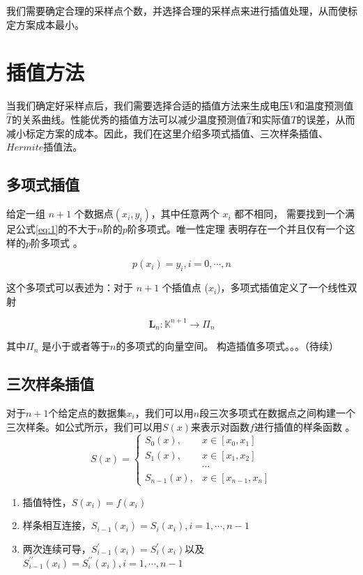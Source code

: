 \documentclass[10.5pt,twocolumn]{jbuaa}
\begin{document}
我们需要确定合理的采样点个数，并选择合理的采样点来进行插值处理，从而使标定方案成本最小。
\section{插值方法}
当我们确定好采样点后，我们需要选择合适的插值方法来生成电压$V$和温度预测值$\hat T$的关系曲线。性能优秀的插值方法可以减少温度预测值$\hat T$和实际值$T$的误差，从而减小标定方案的成本。因此，我们在这里介绍多项式插值、三次样条插值、$Hermite$插值法。

\subsection{多项式插值}
给定一组 $n+1$ 个数据点$(x_i,y_i)$，其中任意两个 $x_i$ 都不相同， 需要找到一个满足公式\ref{eq:1}的不大于$n$阶的$p$阶多项式。\hei 唯一性定理 \normalfont 表明存在一个并且仅有一个这样的$p$阶多项式 。

\begin{equation}
	p(x_i) = y_i, i=0,\cdots,n
	\label{eq:1}
\end{equation}

这个多项式可以表述为：对于 $n + 1$ 个插值点 ($x_i$)，多项式插值定义了一个线性双射

\begin{equation}
	\bm{L}_n : \mathbb{K}^{n + 1} \rightarrow \Pi_n
\end{equation}
 
 其中$\Pi_n$ 是小于或者等于$n$的多项式的向量空间。
 构造插值多项式。。。（待续）
\subsection{三次样条插值}
对于$n+1$个给定点的数据集${x_i}$，我们可以用$n$段三次多项式在数据点之间构建一个三次样条。如公式所示，我们可以用$S(x)$来表示对函数$f$进行插值的样条函数 。
\begin{equation}
				S(x)=
		\begin{cases}
			S_0(x), & x \in [x_0,x_1] \\
			S_1(x), & x \in [x_1,x_2] \\
			 & \cdots \\
		S_{n -1}(x), & x \in [x_{n-1},x_{n}] 
		\end{cases}
\end{equation}
\begin{enumerate}[label=(\roman*)]
	\item 插值特性，$S(x_i) = f(x_i)$
	\item 样条相互连接，$S_{i-1}(x_i) = S_i(x_i), i = 1, \cdots ,n-1$
	\item 两次连续可导，$S^{\prime}_{i - 1}(x_i) = S^{\prime}_{i}(x_i)$以及$S^{\prime\prime}_{i - 1}(x_i) = S^{\prime\prime}_{i}(x_i), i = 1, \cdots , n - 1$
\end{enumerate}
\end{document}
